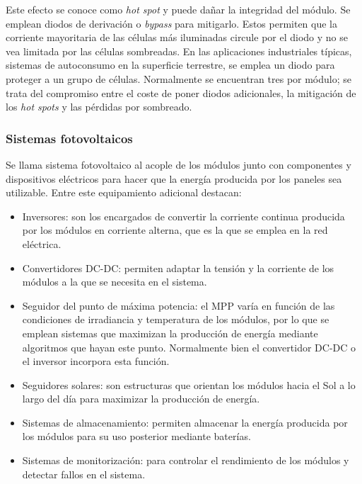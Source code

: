 Este efecto se conoce como \textit{hot spot} y puede dañar la integridad del módulo. Se emplean diodos de derivación o \textit{bypass} para mitigarlo. Estos permiten que la corriente mayoritaria de las células más iluminadas circule por el \gls{diodo} y no se vea limitada por las células sombreadas. En las aplicaciones industriales típicas, sistemas de autoconsumo en la superficie terrestre, se emplea un \gls{diodo} para proteger a un grupo de células. Normalmente se encuentran tres por módulo; se trata del compromiso entre el coste de poner diodos adicionales, la mitigación de los \textit{hot spots} y las pérdidas por sombreado.

\subsubsection{Sistemas fotovoltaicos}

Se llama \gls{sistema fotovoltaico} al acople de los módulos junto con componentes y dispositivos eléctricos para hacer que la energía producida por los paneles sea utilizable. Entre este equipamiento adicional destacan:

\begin{itemize}
      \item Inversores: son los encargados de convertir la corriente continua producida por los módulos en corriente alterna, que es la que se emplea en la red eléctrica.
      \item Convertidores DC-DC: permiten adaptar la tensión y la corriente de los módulos a la que se necesita en el sistema.
      \item Seguidor del punto de máxima potencia: el MPP varía en función de las condiciones de \gls{irradiancia} y temperatura de los módulos, por lo que se emplean sistemas que maximizan la producción de energía mediante algoritmos que hayan este punto. Normalmente bien el convertidor DC-DC o el inversor incorpora esta función.
      \item Seguidores solares: son estructuras que orientan los módulos hacia el Sol a lo largo del día para maximizar la producción de energía.
      \item Sistemas de almacenamiento: permiten almacenar la energía producida por los módulos para su uso posterior mediante baterías.
      \item Sistemas de monitorización: para controlar el rendimiento de los módulos y detectar fallos en el sistema.
\end{itemize}

